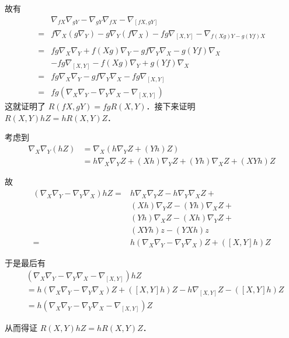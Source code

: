 故有
\begin{equation}
\begin{aligned}
&\nabla_{fX}\nabla_{gY}-\nabla_{gY}\nabla_{fX}-\nabla_{[fX, gY]}\\={}&f\nabla_X(g\nabla_Y)-g\nabla_Y(f\nabla_X)-fg\nabla_{[X, Y]}-\nabla_{f(Xg)Y-g(Yf)X}\\
\\={}&fg\nabla_X\nabla_Y+f(Xg)\nabla_Y-gf\nabla_Y\nabla_X-g(Yf)\nabla_X\\&-fg\nabla_{[X, Y]}-f(Xg)\nabla_Y+g(Yf)\nabla_X\\
={}&fg\nabla_X\nabla_Y-gf\nabla_Y\nabla_X-fg\nabla_{[X, Y]}\\
={}&fg(\nabla_X\nabla_Y-\nabla_Y\nabla_X-\nabla_{[X, Y]})
\end{aligned}
\end{equation}
这就证明了 $R(fX, gY)=fgR(X, Y)$．接下来证明 $R(X, Y)hZ=hR(X, Y)Z$．

考虑到
\begin{equation}
\begin{aligned}
\nabla_X\nabla_Y(hZ)&=\nabla_X(h\nabla_YZ+(Yh)Z)\\
&=h\nabla_X\nabla_YZ+(Xh)\nabla_YZ+(Yh)\nabla_XZ+(XYh)Z
\end{aligned}
\end{equation}

故
\begin{equation}
\begin{aligned}
(\nabla_X\nabla_Y-\nabla_Y\nabla_X)hZ={}& h\nabla_X\nabla_YZ-h\nabla_Y\nabla_XZ+\\&(Xh)\nabla_YZ-(Yh)\nabla_XZ+\\&(Yh)\nabla_XZ-(Xh)\nabla_YZ+\\&(XYh)z-(YXh)z\\
={}& h(\nabla_X\nabla_Y-\nabla_Y\nabla_X)Z+([X, Y]h)Z
\end{aligned}
\end{equation}

于是最后有
\begin{equation}
\begin{aligned}
&(\nabla_X\nabla_Y-\nabla_Y\nabla_X-\nabla_{[X, Y]})hZ\\
&=h(\nabla_X\nabla_Y-\nabla_Y\nabla_X)Z+([X, Y]h)Z-h\nabla_{[X, Y]}Z-([X, Y]h)Z\\
&=h(\nabla_X\nabla_Y-\nabla_Y\nabla_X-\nabla_{[X, Y]})Z
\end{aligned}
\end{equation}

从而得证 $R(X, Y)hZ=hR(X, Y)Z$．

